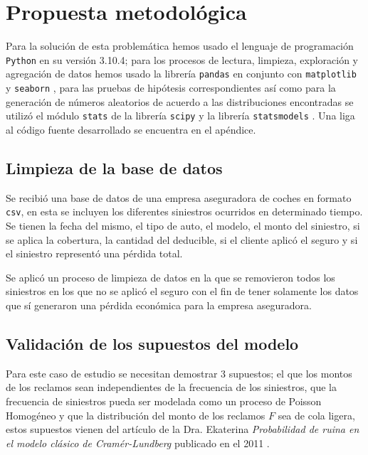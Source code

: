 \documentclass[journal]{IEEEtran}
\begin{document}
    \section{Propuesta metodológica} \label{sec:proposed-method}

        Para la solución de esta problemática hemos usado el lenguaje de programación \texttt{Python} en su versión 3.10.4; para los procesos de lectura, limpieza, exploración y agregación de datos hemos usado la librería \texttt{pandas} \cite{pandas} en conjunto con \texttt{matplotlib} \cite{matplotlib} y \texttt{seaborn} \cite{seaborn}, para las pruebas de hipótesis correspondientes así como para la generación de números aleatorios de acuerdo a las distribuciones encontradas se utilizó el módulo \texttt{stats} de la librería \texttt{scipy} \cite{scipy} y la librería \texttt{statsmodels} \cite{seabold2010statsmodels}. Una liga al código fuente desarrollado se encuentra en el apéndice.

        \subsection{Limpieza de la base de datos}

            Se recibió una base de datos de una empresa aseguradora de coches en formato \texttt{csv}, en esta se incluyen los diferentes siniestros ocurridos en determinado tiempo. Se tienen la fecha del mismo, el tipo de auto, el modelo, el monto del siniestro, si se aplica la cobertura, la cantidad del deducible, si el cliente aplicó el seguro y si el siniestro representó una pérdida total.
        
            Se aplicó un proceso de limpieza de datos en la que se removieron todos los siniestros en los que no se aplicó el seguro con el fin de tener solamente los datos que sí generaron una pérdida económica para la empresa aseguradora.

        \subsection{Validación de los supuestos del modelo}

            Para este caso de estudio se necesitan demostrar 3 supuestos; el que los montos de los reclamos sean independientes de la frecuencia de los siniestros, que la frecuencia de siniestros pueda ser modelada como un proceso de Poisson Homogéneo y que la distribución del monto de los reclamos $F$ sea de cola ligera, estos supuestos vienen del artículo de la Dra. Ekaterina \emph{Probabilidad de ruina en el modelo clásico de Cramér-Lundberg} publicado en el 2011 \cite{ekaterina}.
\end{document}
